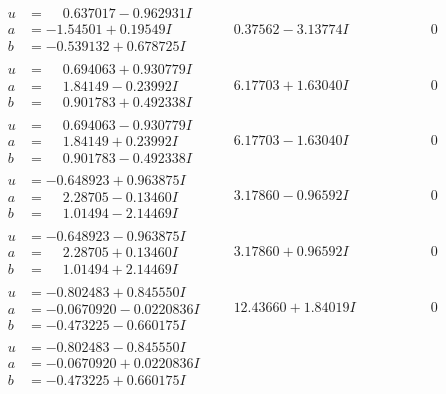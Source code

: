 \documentclass[1p]{elsarticle_modified}
\theoremstyle{definition}
\begin{document}
$$\begin{array}{c|c|c}
\begin{aligned}
u &= \phantom{-}0.637017 - 0.962931 I \\
a &= -1.54501 + 0.19549 I \\
b &= -0.539132 + 0.678725 I\end{aligned}
 & \phantom{-}0.37562 - 3.13774 I & \phantom{-0.000000 } 0 \\ \hline\begin{aligned}
u &= \phantom{-}0.694063 + 0.930779 I \\
a &= \phantom{-}1.84149 - 0.23992 I \\
b &= \phantom{-}0.901783 + 0.492338 I\end{aligned}
 & \phantom{-}6.17703 + 1.63040 I & \phantom{-0.000000 } 0 \\ \hline\begin{aligned}
u &= \phantom{-}0.694063 - 0.930779 I \\
a &= \phantom{-}1.84149 + 0.23992 I \\
b &= \phantom{-}0.901783 - 0.492338 I\end{aligned}
 & \phantom{-}6.17703 - 1.63040 I & \phantom{-0.000000 } 0 \\ \hline\begin{aligned}
u &= -0.648923 + 0.963875 I \\
a &= \phantom{-}2.28705 - 0.13460 I \\
b &= \phantom{-}1.01494 - 2.14469 I\end{aligned}
 & \phantom{-}3.17860 - 0.96592 I & \phantom{-0.000000 } 0 \\ \hline\begin{aligned}
u &= -0.648923 - 0.963875 I \\
a &= \phantom{-}2.28705 + 0.13460 I \\
b &= \phantom{-}1.01494 + 2.14469 I\end{aligned}
 & \phantom{-}3.17860 + 0.96592 I & \phantom{-0.000000 } 0 \\ \hline\begin{aligned}
u &= -0.802483 + 0.845550 I \\
a &= -0.0670920 - 0.0220836 I \\
b &= -0.473225 - 0.660175 I\end{aligned}
 & \phantom{-}12.43660 + 1.84019 I & \phantom{-0.000000 } 0 \\ \hline\begin{aligned}
u &= -0.802483 - 0.845550 I \\
a &= -0.0670920 + 0.0220836 I \\
b &= -0.473225 + 0.660175 I\end{aligned}

\end{array}$$
\end{document}
